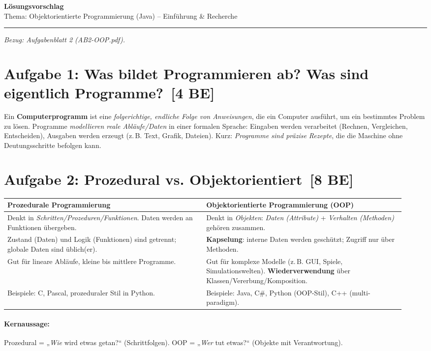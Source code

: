 \documentclass[11pt,a4paper]{scrartcl}
\newcommand{\sheettitle}[2]{%
	{\Large\bfseries #1}\\[-0.2em]
	{\normalsize #2}\par\hrule\vspace{1.0em}
}
\begin{document}
	
	\sheettitle{Lösungsvorschlag}{Thema: Objektorientierte Programmierung (Java) – Einführung \& Recherche}
	
	\small\emph{Bezug: Aufgabenblatt 2 (AB2-OOP.pdf).}
	
	\section*{Aufgabe 1: Was bildet Programmieren ab? Was sind eigentlich Programme? \,[4 BE]}
	Ein \textbf{Computerprogramm} ist eine \emph{folgerichtige, endliche Folge von Anweisungen}, die ein Computer ausführt, um ein bestimmtes Problem zu lösen. Programme \emph{modellieren reale Abläufe/Daten} in einer formalen Sprache: Eingaben werden verarbeitet (Rechnen, Vergleichen, Entscheiden), Ausgaben werden erzeugt (z.\,B. Text, Grafik, Dateien). Kurz: \emph{Programme sind präzise Rezepte}, die die Maschine ohne Deutungsschritte befolgen kann.
	
	\section*{Aufgabe 2: Prozedural vs. Objektorientiert \,[8 BE]}
	\renewcommand{\arraystretch}{1.25}
	\begin{tabularx}{\linewidth}{|p{0.47\linewidth}|p{0.47\linewidth}|}
		\hline
		\textbf{Prozedurale Programmierung} & \textbf{Objektorientierte Programmierung (OOP)}\\\hline
		Denkt in \emph{Schritten/Prozeduren/Funktionen}. Daten werden an Funktionen übergeben. & Denkt in \emph{Objekten}: \emph{Daten (Attribute)} + \emph{Verhalten (Methoden)} gehören zusammen.\\\hline
		Zustand (Daten) und Logik (Funktionen) sind getrennt; globale Daten sind üblich(er). & \textbf{Kapselung}: interne Daten werden geschützt; Zugriff nur über Methoden.\\\hline
		Gut für lineare Abläufe, kleine bis mittlere Programme. & Gut für komplexe Modelle (z.\,B. GUI, Spiele, Simulationswelten). \textbf{Wiederverwendung} über Klassen/Vererbung/Komposition.\\\hline
		Beispiele: C, Pascal, prozeduraler Stil in Python. & Beispiele: Java, C\#, Python (OOP-Stil), C++ (multi-paradigm).\\\hline
	\end{tabularx}
	
	\paragraph{Kernaussage:} Prozedural = „\emph{Wie} wird etwas getan?“ (Schrittfolgen). OOP = „\emph{Wer} tut etwas?“ (Objekte mit Verantwortung).
	
\end{document}
